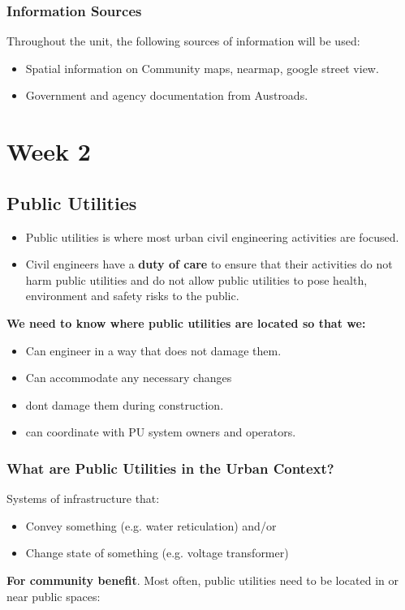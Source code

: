 \documentclass{report}
\begin{document}
	\subsection{Information Sources}
	Throughout the unit, the following sources of information will be used:
	\begin{itemize}
		\item Spatial information on Community maps, nearmap, google street view. 
		\item Government and agency documentation from Austroads. 
	\end{itemize}


	
	\newpage

	\chapter{Week 2}

	\section{Public Utilities}

	\begin{itemize}
		\item Public utilities is where most urban civil engineering activities are focused.
		\item Civil engineers have a \textbf{duty of care} to ensure that their activities do not harm public utilities and do not allow public utilities to pose health, environment and safety risks to the public.
	\end{itemize}
	\textbf{We need to know where public utilities are located so that we:}

	\begin{itemize}
		\item Can engineer in a way that does not damage them.
		\item Can accommodate any necessary changes
		\item dont damage them during construction.
		\item can coordinate with PU system owners and operators.
	\end{itemize}

	\subsection{What are Public Utilities in the Urban Context?}
	Systems of infrastructure that:

	\begin{itemize}
		\item Convey something (e.g. water reticulation) and/or
		\item Change state of something (e.g. voltage transformer)
	\end{itemize}
	\textbf{For community benefit}. Most often, public utilities need to be located in or near public spaces:
\end{document}

